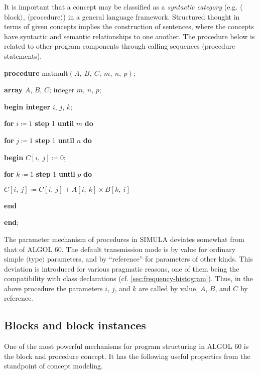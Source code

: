 It is important that a concept may be classified as a \textit{syntactic category} (e.g. $\langle$block$\rangle$, $\langle$procedure$\rangle$) in a general language framework. Structured thought in terms of given concepts implies the construction of sentences, where the concepts have syntactic and semantic relationships to one another. The procedure below is related to other program components through calling sequences (procedure statements).

\quad \textbf{procedure} matmult$(A,\ B,\ C,\ m,\ n,\ p)$;

\quad \quad \textbf{array} $A$, $B$, $C$; integer $m$, $n$, $p$;

\quad \textbf{begin integer} $i$, $j$, $k$;

\quad \quad \textbf{for} $i\coloneq 1$ \textbf{step} 1 \textbf{until} $m$ \textbf{do}

\quad \quad \textbf{for} $j\coloneq 1$ \textbf{step} 1 \textbf{until} $n$ \textbf{do}

\quad \quad \textbf{begin} $C[i,\ j]\coloneq 0$;

\quad \quad \quad \textbf{for} $k\coloneq 1$ \textbf{step} 1 \textbf{until} $p$ \textbf{do}

\quad \quad \quad \quad $C[i,\ j]\coloneq C[i,\ j] + A[i,\ k] \times B[k,\ i]$

\quad \quad \textbf{end}

\quad \textbf{end};

The parameter mechanism of procedures in SIMULA deviates somewhat from that of ALGOL 60. The default transmission mode is by value for ordinary simple $\langle$type$\rangle$ parameters, and by ``reference'' for parameters of other kinds. This deviation is introduced for various pragmatic reasons, one of them being the compatibility with class declarations (cf. \ref{sec:frequency-histogram}). Thus, in the above procedure the parameters $i$, $j$, and $k$ are called by value, $A$, $B$, and $C$ by reference.

\subsection{Blocks and block instances}

One of the most powerful mechanisms for program structuring in ALGOL 60 is the block and procedure concept. It has the following useful properties from the standpoint of concept modeling.

